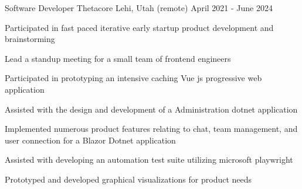 

\begin{cventries}

  \cventry
    {Software Developer} %
    {Thetacore} %
    {Lehi, Utah (remote)} %
    {April 2021 - June 2024} %
    {
      \begin{cvitems} %
        \item {Participated in fast paced iterative early startup product development and brainstorming}
        \item {Lead a standup meeting for a small team of frontend engineers}
        \item {Participated in prototyping an intensive caching Vue js progressive web application}
        \item {Assisted with the design and development of a Administration dotnet application}
        \item {Implemented numerous product features relating to chat, team management, and user connection for a Blazor Dotnet application}
        \item {Assisted with developing an automation test suite utilizing microsoft playwright}
        \item {Prototyped and developed graphical visualizations for product needs}
      \end{cvitems}
    }
    

\end{cventries}
